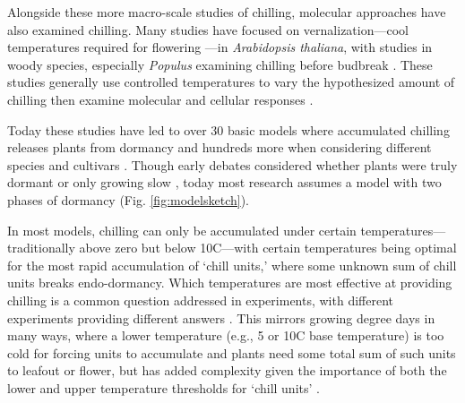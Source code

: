 \documentclass[11pt]{article}
\begin{document}
Alongside these more macro-scale studies of chilling, molecular approaches have also examined chilling. Many studies have focused on vernalization---cool temperatures required for flowering \citep{kim2009vernalization}---in \emph{Arabidopsis thaliana}, with studies in woody species, especially \emph{Populus} examining chilling before budbreak \citep[][]{azeez2021early,cai2024molecular}. These studies generally use controlled temperatures to vary the hypothesized amount of chilling then examine molecular and cellular responses \citep[e.g.,][]{pan2021aba,azeez2021early,cai2024molecular}.

Today these studies have led to over 30 basic models where accumulated chilling releases plants from dormancy and hundreds more when considering different species and cultivars \citep[][]{basler2016evaluating,hufkens2018integrated}. Though early debates considered whether plants were truly dormant or only growing slow \citep[`dormancy' or `rest' versus `quiescent';][]{considine2016language}, today most research assumes a model with two phases of dormancy (Fig. \ref{fig:modelsketch}). 

In most models, chilling can only be accumulated under certain temperatures---traditionally above zero but below 10\degree C---with certain temperatures 
being optimal for the most rapid accumulation of `chill units,' where some unknown sum of chill units breaks endo-dormancy. Which temperatures are most effective at providing chilling is a common question addressed in experiments, with different experiments providing different answers \citep{vitasselev,baum2021}. This mirrors growing degree days in many ways, where a lower temperature (e.g., 5 or 10\degree C base temperature) is too cold for forcing units to accumulate and plants need some total sum of such units to leafout or flower, but has added complexity given the importance of both the lower and upper temperature thresholds for `chill units' \citep[whereas growing degree day models can often ignore the upper threshold, estimated at 25\degree C or above, as it is rarely reached in natural spring conditions,][]{mcmaster1997growing,li2021comparisons}. %
\end{document}

